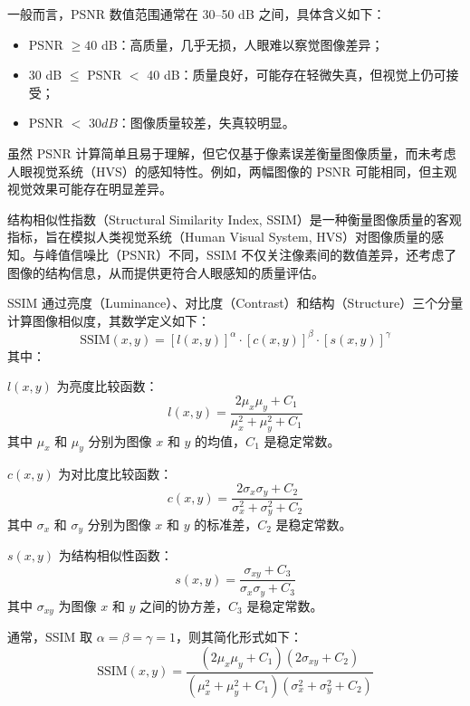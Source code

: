 一般而言，PSNR 数值范围通常在 30–50 dB 之间，具体含义如下：
\begin{itemize}
    \item PSNR $\geq 40$ dB：高质量，几乎无损，人眼难以察觉图像差异；
    \item 30 dB $\leq$ PSNR $<$ 40 dB：质量良好，可能存在轻微失真，但视觉上仍可接受；
    \item PSNR $<$ 30$ dB$：图像质量较差，失真较明显。
\end{itemize}

虽然 PSNR 计算简单且易于理解，但它仅基于像素误差衡量图像质量，而未考虑人眼视觉系统（HVS）的感知特性。例如，两幅图像的 PSNR 可能相同，但主观视觉效果可能存在明显差异。

结构相似性指数（Structural Similarity Index, SSIM）是一种衡量图像质量的客观指标，旨在模拟人类视觉系统（Human Visual System, HVS）对图像质量的感知。与峰值信噪比（PSNR）不同，SSIM 不仅关注像素间的数值差异，还考虑了图像的结构信息，从而提供更符合人眼感知的质量评估。

SSIM 通过亮度（Luminance）、对比度（Contrast）和结构（Structure）三个分量计算图像相似度，其数学定义如下：
\begin{equation}
\text{SSIM}(x, y) = [l(x, y)]^\alpha \cdot [c(x, y)]^\beta \cdot [s(x, y)]^\gamma
\end{equation}
其中：

$l(x, y)$ 为亮度比较函数：
\begin{equation}
l(x, y) = \frac{2\mu_x\mu_y + C_1}{\mu_x^2 + \mu_y^2 + C_1}
\end{equation}
其中 $\mu_x$ 和 $\mu_y$ 分别为图像 $x$ 和 $y$ 的均值，$C_1$ 是稳定常数。

$c(x, y)$ 为对比度比较函数：
\begin{equation}
c(x, y) = \frac{2\sigma_x\sigma_y + C_2}{\sigma_x^2 + \sigma_y^2 + C_2}
\end{equation}
其中 $\sigma_x$ 和 $\sigma_y$ 分别为图像 $x$ 和 $y$ 的标准差，$C_2$ 是稳定常数。

$s(x, y)$ 为结构相似性函数：
\begin{equation}
s(x, y) = \frac{\sigma_{xy} + C_3}{\sigma_x \sigma_y + C_3}
\end{equation}
其中 $\sigma_{xy}$ 为图像 $x$ 和 $y$ 之间的协方差，$C_3$ 是稳定常数。


通常，SSIM 取 $\alpha = \beta = \gamma = 1$，则其简化形式如下：
\begin{equation}
    \text{SSIM}(x, y) = \frac{(2\mu_x\mu_y + C_1)(2\sigma_{xy} + C_2)}{(\mu_x^2 + \mu_y^2 + C_1)(\sigma_x^2 + \sigma_y^2 + C_2)}
\end{equation}

